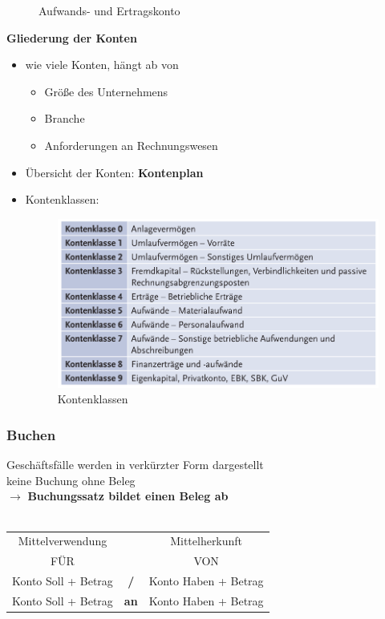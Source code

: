 \documentclass[a4paper, ngerman]{article}
\begin{document}
\begin{itemize}
\begin{itemize}
\begin{figure}[h]
                        \caption{Aufwands- und Ertragskonto}
                    \end{figure}
          \end{itemize}
\end{itemize}
\textbf{Gliederung der Konten}
\begin{itemize}
    \item wie viele Konten, hängt ab von
          \begin{itemize}
              \item Größe des Unternehmens
              \item Branche
              \item Anforderungen an Rechnungswesen
          \end{itemize}
    \item Übersicht der Konten: \textbf{Kontenplan}
    \item Kontenklassen:
          \begin{figure}[H]
              \centering
              \includegraphics[scale=0.4]{pics/kontenklassen.png}
              \caption{Kontenklassen}
          \end{figure}
\end{itemize}
\subsubsection{Buchen}
Geschäftsfälle werden in verkürzter Form dargestellt \\
keine Buchung ohne Beleg \\
$\rightarrow$ \textbf{Buchungssatz bildet einen Beleg ab} \\ \\

\begin{tabular}{ c c c }
    Mittelverwendung    &             & Mittelherkunft       \\
    FÜR                 &             & VON                  \\
    Konto Soll + Betrag & \textbf{/}  & Konto Haben + Betrag \\
    Konto Soll + Betrag & \textbf{an} & Konto Haben + Betrag
\end{tabular}
\end{document}
